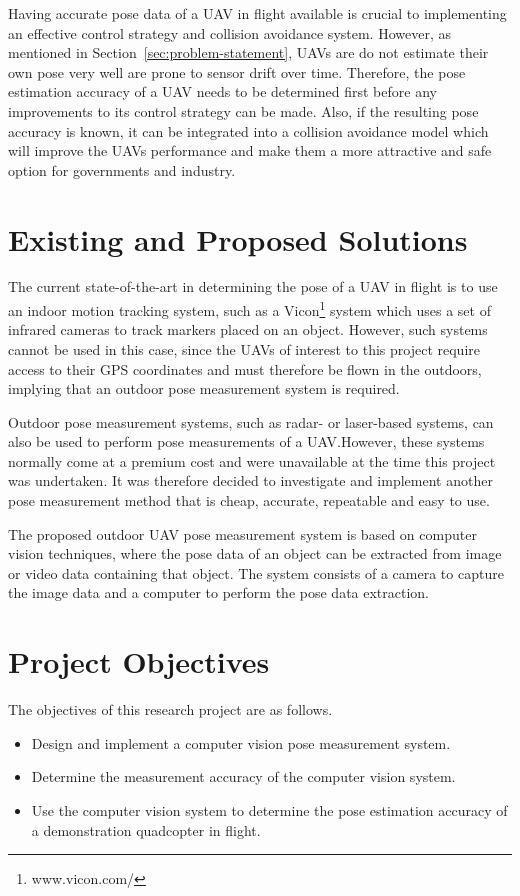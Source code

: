 Having accurate pose data of a UAV in flight available is crucial to implementing an effective control strategy and collision avoidance system. However, as mentioned in Section~\ref{sec:problem-statement}, UAVs are do not estimate their own pose very well are prone to sensor drift over time. Therefore, the pose estimation accuracy of a UAV needs to be determined first before any improvements to its control strategy can be made. Also, if the resulting pose accuracy is known, it can be integrated into a collision avoidance model which will improve the UAVs performance and make them a more attractive and safe option for governments and industry. 

\section{Existing and Proposed Solutions}

The current state-of-the-art in determining the pose of a UAV in flight is to use an indoor motion tracking system, such as a Vicon\footnote{www.vicon.com/} system which uses a set of infrared cameras to track markers placed on an object. However, such systems cannot be used in this case, since the UAVs of interest to this project require access to their GPS coordinates and must therefore be flown in the outdoors, implying that an outdoor pose measurement system is required. 

Outdoor pose measurement systems, such as radar- or laser-based systems, can also be used to perform pose measurements of a UAV.\@ However, these systems normally come at a premium cost and were unavailable at the time this project was undertaken. It was therefore decided to investigate and implement another pose measurement method that is cheap, accurate, repeatable and easy to use. 

The proposed outdoor UAV pose measurement system is based on computer vision techniques, where the pose data of an object can be extracted from image or video data containing that object. The system consists of a camera to capture the image data and a computer to perform the pose data extraction. 

\section{Project Objectives}

The objectives of this research project are as follows. 

\begin{itemize}
  \item Design and implement a computer vision pose measurement system.
  \item Determine the measurement accuracy of the computer vision system.
  \item Use the computer vision system to determine the pose estimation accuracy of a demonstration quadcopter in flight. 
\end{itemize}

